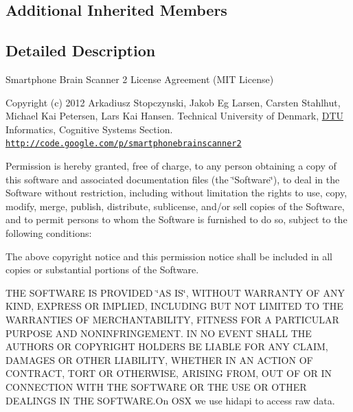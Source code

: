 \subsection*{Additional Inherited Members}


\subsection{Detailed Description}
Smartphone Brain Scanner 2 License Agreement (M\-I\-T License)

Copyright (c) 2012 Arkadiusz Stopczynski, Jakob Eg Larsen, Carsten Stahlhut, Michael Kai Petersen, Lars Kai Hansen. Technical University of Denmark, \hyperlink{namespaceDTU}{D\-T\-U} Informatics, Cognitive Systems Section. \href{http://code.google.com/p/smartphonebrainscanner2}{\tt http\-://code.\-google.\-com/p/smartphonebrainscanner2}

Permission is hereby granted, free of charge, to any person obtaining a copy of this software and associated documentation files (the \char`\"{}\-Software\char`\"{}), to deal in the Software without restriction, including without limitation the rights to use, copy, modify, merge, publish, distribute, sublicense, and/or sell copies of the Software, and to permit persons to whom the Software is furnished to do so, subject to the following conditions\-:

The above copyright notice and this permission notice shall be included in all copies or substantial portions of the Software.

T\-H\-E S\-O\-F\-T\-W\-A\-R\-E I\-S P\-R\-O\-V\-I\-D\-E\-D \char`\"{}\-A\-S I\-S\char`\"{}, W\-I\-T\-H\-O\-U\-T W\-A\-R\-R\-A\-N\-T\-Y O\-F A\-N\-Y K\-I\-N\-D, E\-X\-P\-R\-E\-S\-S O\-R I\-M\-P\-L\-I\-E\-D, I\-N\-C\-L\-U\-D\-I\-N\-G B\-U\-T N\-O\-T L\-I\-M\-I\-T\-E\-D T\-O T\-H\-E W\-A\-R\-R\-A\-N\-T\-I\-E\-S O\-F M\-E\-R\-C\-H\-A\-N\-T\-A\-B\-I\-L\-I\-T\-Y, F\-I\-T\-N\-E\-S\-S F\-O\-R A P\-A\-R\-T\-I\-C\-U\-L\-A\-R P\-U\-R\-P\-O\-S\-E A\-N\-D N\-O\-N\-I\-N\-F\-R\-I\-N\-G\-E\-M\-E\-N\-T. I\-N N\-O E\-V\-E\-N\-T S\-H\-A\-L\-L T\-H\-E A\-U\-T\-H\-O\-R\-S O\-R C\-O\-P\-Y\-R\-I\-G\-H\-T H\-O\-L\-D\-E\-R\-S B\-E L\-I\-A\-B\-L\-E F\-O\-R A\-N\-Y C\-L\-A\-I\-M, D\-A\-M\-A\-G\-E\-S O\-R O\-T\-H\-E\-R L\-I\-A\-B\-I\-L\-I\-T\-Y, W\-H\-E\-T\-H\-E\-R I\-N A\-N A\-C\-T\-I\-O\-N O\-F C\-O\-N\-T\-R\-A\-C\-T, T\-O\-R\-T O\-R O\-T\-H\-E\-R\-W\-I\-S\-E, A\-R\-I\-S\-I\-N\-G F\-R\-O\-M, O\-U\-T O\-F O\-R I\-N C\-O\-N\-N\-E\-C\-T\-I\-O\-N W\-I\-T\-H T\-H\-E S\-O\-F\-T\-W\-A\-R\-E O\-R T\-H\-E U\-S\-E O\-R O\-T\-H\-E\-R D\-E\-A\-L\-I\-N\-G\-S I\-N T\-H\-E S\-O\-F\-T\-W\-A\-R\-E.\-On O\-S\-X we use hidapi to access raw data. 


